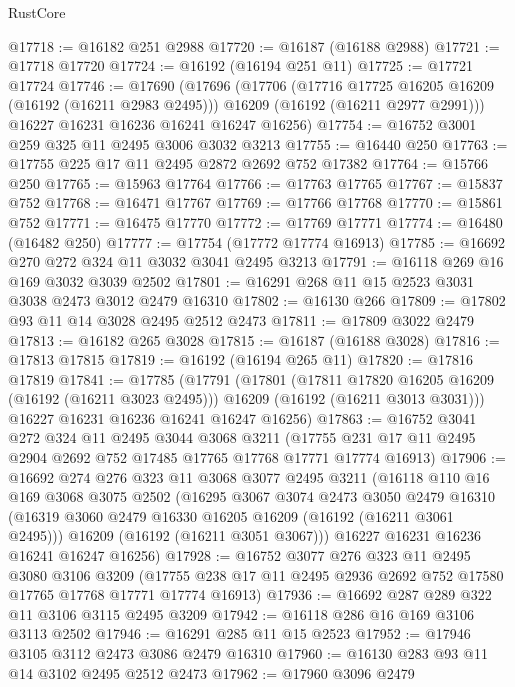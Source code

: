 \begin{lexlean}{RustCore}
\begin{coremodule}
@17718 := @16182 @251 @2988
@17720 := @16187 (@16188 @2988)
@17721 := @17718 @17720
@17724 := @16192 (@16194 @251 @11)
@17725 := @17721 @17724
@17746 := @17690
    (@17696
      (@17706
        (@17716 @17725 @16205 @16209 (@16192 (@16211 @2983 @2495)))
        @16209
        (@16192 (@16211 @2977 @2991)))
      @16227
      @16231
      @16236
      @16241
      @16247
      @16256)
@17754 := @16752 @3001 @259 @325 @11 @2495 @3006 @3032 @3213
@17755 := @16440 @250
@17763 := @17755 @225 @17 @11 @2495 @2872 @2692 @752 @17382
@17764 := @15766 @250
@17765 := @15963 @17764
@17766 := @17763 @17765
@17767 := @15837 @752
@17768 := @16471 @17767
@17769 := @17766 @17768
@17770 := @15861 @752
@17771 := @16475 @17770
@17772 := @17769 @17771
@17774 := @16480 (@16482 @250)
@17777 := @17754 (@17772 @17774 @16913)
@17785 := @16692 @270 @272 @324 @11 @3032 @3041 @2495 @3213
@17791 := @16118 @269 @16 @169 @3032 @3039 @2502
@17801 := @16291 @268 @11 @15 @2523 @3031 @3038 @2473 @3012 @2479 @16310
@17802 := @16130 @266
@17809 := @17802 @93 @11 @14 @3028 @2495 @2512 @2473
@17811 := @17809 @3022 @2479
@17813 := @16182 @265 @3028
@17815 := @16187 (@16188 @3028)
@17816 := @17813 @17815
@17819 := @16192 (@16194 @265 @11)
@17820 := @17816 @17819
@17841 := @17785
    (@17791
      (@17801
        (@17811 @17820 @16205 @16209 (@16192 (@16211 @3023 @2495)))
        @16209
        (@16192 (@16211 @3013 @3031)))
      @16227
      @16231
      @16236
      @16241
      @16247
      @16256)
@17863 := @16752
    @3041
    @272
    @324
    @11
    @2495
    @3044
    @3068
    @3211
    (@17755 @231 @17 @11 @2495 @2904 @2692 @752 @17485 @17765 @17768 @17771 @17774 @16913)
@17906 := @16692
    @274
    @276
    @323
    @11
    @3068
    @3077
    @2495
    @3211
    (@16118
      @110
      @16
      @169
      @3068
      @3075
      @2502
      (@16295
        @3067
        @3074
        @2473
        @3050
        @2479
        @16310
        (@16319 @3060 @2479 @16330 @16205 @16209 (@16192 (@16211 @3061 @2495)))
        @16209
        (@16192 (@16211 @3051 @3067)))
      @16227
      @16231
      @16236
      @16241
      @16247
      @16256)
@17928 := @16752
    @3077
    @276
    @323
    @11
    @2495
    @3080
    @3106
    @3209
    (@17755 @238 @17 @11 @2495 @2936 @2692 @752 @17580 @17765 @17768 @17771 @17774 @16913)
@17936 := @16692 @287 @289 @322 @11 @3106 @3115 @2495 @3209
@17942 := @16118 @286 @16 @169 @3106 @3113 @2502
@17946 := @16291 @285 @11 @15 @2523
@17952 := @17946 @3105 @3112 @2473 @3086 @2479 @16310
@17960 := @16130 @283 @93 @11 @14 @3102 @2495 @2512 @2473
@17962 := @17960 @3096 @2479

\end{coremodule}
\end{lexlean}

